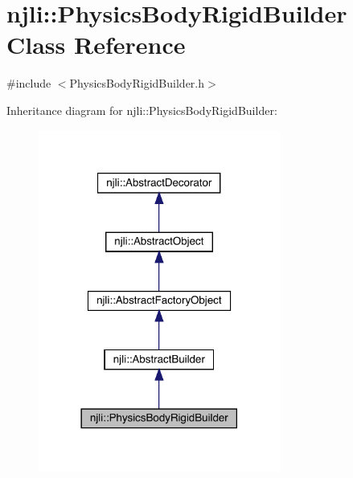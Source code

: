 \hypertarget{classnjli_1_1_physics_body_rigid_builder}{}\section{njli\+:\+:Physics\+Body\+Rigid\+Builder Class Reference}
\label{classnjli_1_1_physics_body_rigid_builder}


{\ttfamily \#include $<$Physics\+Body\+Rigid\+Builder.\+h$>$}



Inheritance diagram for njli\+:\+:Physics\+Body\+Rigid\+Builder\+:\nopagebreak
\begin{figure}[H]
\begin{center}
\leavevmode
\includegraphics[width=225pt]{classnjli_1_1_physics_body_rigid_builder__inherit__graph}
\end{center}
\end{figure}


